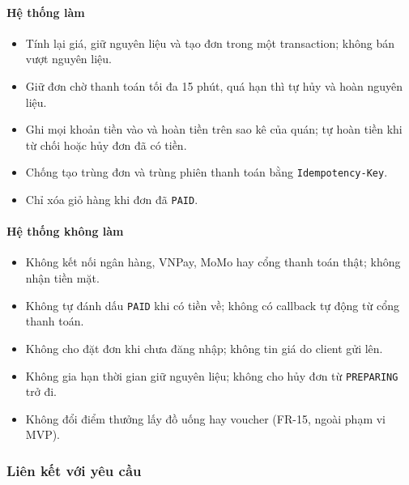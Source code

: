 \paragraph{Hệ thống làm}
\begin{itemize}
  \item Tính lại giá, giữ nguyên liệu và tạo đơn trong một transaction; không bán vượt nguyên liệu.
  \item Giữ đơn chờ thanh toán tối đa 15 phút, quá hạn thì tự hủy và hoàn nguyên liệu.
  \item Ghi mọi khoản tiền vào và hoàn tiền trên sao kê của quán; tự hoàn tiền khi từ chối hoặc hủy đơn đã có tiền.
  \item Chống tạo trùng đơn và trùng phiên thanh toán bằng \texttt{Idempotency-Key}.
  \item Chỉ xóa giỏ hàng khi đơn đã \texttt{PAID}.
\end{itemize}

\paragraph{Hệ thống không làm}
\begin{itemize}
  \item Không kết nối ngân hàng, VNPay, MoMo hay cổng thanh toán thật; không nhận tiền mặt.
  \item Không tự đánh dấu \texttt{PAID} khi có tiền về; không có callback tự động từ cổng thanh toán.
  \item Không cho đặt đơn khi chưa đăng nhập; không tin giá do client gửi lên.
  \item Không gia hạn thời gian giữ nguyên liệu; không cho hủy đơn từ \texttt{PREPARING} trở đi.
  \item Không đổi điểm thưởng lấy đồ uống hay voucher (FR-15, ngoài phạm vi MVP).
\end{itemize}

\subsubsection{Liên kết với yêu cầu}

